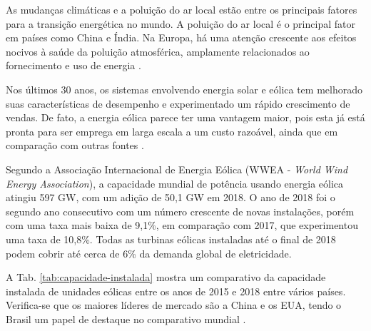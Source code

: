As mudanças climáticas e a poluição do ar local estão entre os principais fatores para a transição energética no mundo. 
A poluição do ar local é o principal fator em países como China e Índia. 
Na Europa, há uma atenção crescente aos efeitos nocivos à saúde da poluição atmosférica, amplamente relacionados ao fornecimento e uso de energia \cite{Gielen2019}.


Nos últimos 30 anos, os sistemas envolvendo energia solar e eólica tem melhorado suas características de desempenho e experimentado um rápido crescimento de vendas. 
De fato, a energia eólica parece ter uma vantagem maior, pois esta já está pronta para ser emprega em larga escala a um custo razoável, ainda que em comparação com outras fontes \cite{Kumar2016}.

Segundo a Associação Internacional de Energia Eólica (WWEA - \textit{World Wind Energy Association}), a capacidade mundial de potência usando energia eólica atingiu 597 GW, com um adição de 50,1 GW em 2018.
O ano de 2018 foi o segundo ano consecutivo com um número crescente de novas instalações, porém com uma taxa mais baixa de 9,1\%, em comparação com 2017, que experimentou uma taxa de 10,8\%.
Todas as turbinas eólicas instaladas até o final de 2018 podem cobrir até cerca de 6\% da demanda global de eletricidade.

A Tab. \ref{tab:capacidade-instalada} mostra um comparativo da capacidade instalada de unidades eólicas entre os anos de 2015 e 2018 entre vários países.
Verifica-se que os maiores líderes de mercado são a China e os EUA, tendo o Brasil um papel de destaque no comparativo mundial \cite{WEI}.

